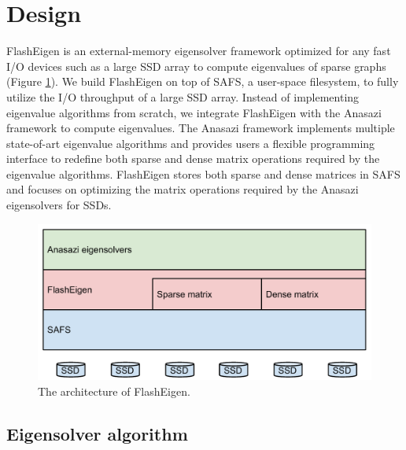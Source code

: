 \section{Design}
FlashEigen is an external-memory eigensolver framework optimized for any fast
I/O devices
such as a large SSD array to compute eigenvalues of sparse graphs (Figure
\ref{arch}). We build FlashEigen on top of SAFS, a user-space filesystem,
to fully utilize the I/O throughput of a large SSD array. Instead of
implementing eigenvalue algorithms from scratch, we integrate FlashEigen
with the Anasazi framework to compute eigenvalues. The Anasazi framework
implements multiple state-of-art eigenvalue algorithms and provides users
a flexible programming interface to redefine both sparse and dense matrix
operations required by the eigenvalue algorithms. FlashEigen stores both sparse
and dense matrices in SAFS and focuses on optimizing the matrix operations
required by the Anasazi eigensolvers for SSDs.

\begin{figure}
\centering
\includegraphics[scale=0.4]{./architecture.pdf}
\vspace{-5pt}
\caption{The architecture of FlashEigen.}
\vspace{-5pt}
\label{arch}
\end{figure}

\subsection{Eigensolver algorithm}


